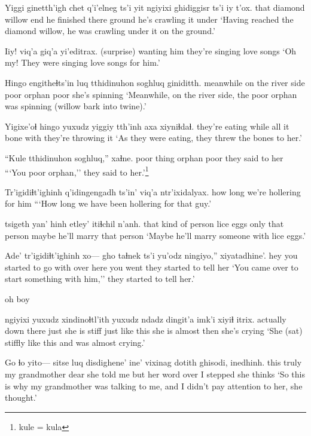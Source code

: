 \documentclass[12pt]{article}
\begin{document}
\gll Yiggi ginetth'igh    chet {q'i'elneg ts'i} yit ngiyixi ghidiggisr  ts'i  iy    t'ox. 
that  {diamond willow} end  {he finished}      there ground  {he's crawling} {} it under
\glt `Having reached the diamond willow, he was crawling under it on the ground.'
\glend

\gll Iiy! viq'a       {giq'a yi'editrax}.
(surprise) {wanting him} {they're singing love songs}
\glt `Oh my! They were singing love songs for him.'
\glend

\gll Hingo     engitheɬts'in      luq  tthidinuhon soghluq giniditth.
meanwhile {on the river side} poor orphan      poor   {she's spinning}
\glt `Meanwhile, on the river side, the poor orphan was spinning (willow bark into twine).'
\glend

\gll Yigixe'oɬ      hingo yuxudz yiggiy tth'inh axa  xiyniɬdaɬ.
{they're eating} while all    it     bone    with {they're throwing it}
\glt `As they were eating, they threw the bones to her.'
\glend

\gll ``Kule       tthidinuhon soghluq,'' xaɬne.
{poor thing} orphan      poor    {they said to her}
\glt ```You poor orphan,'' they said to her.'\footnote{kule = kula}
\glend

\gll Tr'igidiɬt'ighinh q'idingengadh    ts'in' {viq'a ntr'ixidalyax}.
{}                {how long }   {}     {we're hollering for him }
\glt ```How long we have been hollering for that guy.'
\glend

      tsigeth   yan' hinh etley' itiɬchil     n'anh.
{that kind of person}  {lice eggs} only  {that person} maybe {he'll marry} {that person}
\glt `Maybe he'll marry someone with lice eggs.'
\glend

\gll Ade' tr'igidiɬt'ighinh xo--- {gho taɬnek}            ts'i  yu'odz    ningiyo,''  xiyatadhine'.
hey  {}           {}     {you started to go with} {} {over here} {you went} {they started to tell her}
\glt `You came over to start something with him,'' they started to tell her.'
\glend

oh boy

 ngiyixi yuxudz xindinoɬtl'ith       yuxudz ndadz dingit'a imk'i  xiyiɬ itrix.
actually  {down there} just {she is stiff} just  {like this} {she is}  almost then  {she's crying}
\glt `She (sat) stiffly like this and was almost crying.'
\glend

\gll Go   ɬo    yito--- sitse          luq     disdighene' ine'  vixinag  dotith ghisodi, inedhinh.
this truly   {}  {my grandmother} dear    {she told me} but  {her word} over   {I stepped}    {she thinks}
\glt `So this is why my grandmother was talking to me, and I didn't pay attention to her, she thought.'
\glend
\end{document}
